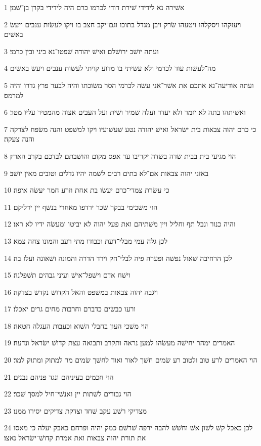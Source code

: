 \par 1 אשׁירה נא לידידי שׁירת דודי לכרמו כרם היה לידידי בקרן בן־שׁמן׃
\par 2 ויעזקהו ויסקלהו ויטעהו שׂרק ויבן מגדל בתוכו וגם־יקב חצב בו ויקו לעשׂות ענבים ויעשׂ באשׁים׃
\par 3 ועתה יושׁב ירושׁלם ואישׁ יהודה שׁפטו־נא ביני ובין כרמי׃
\par 4 מה־לעשׂות עוד לכרמי ולא עשׂיתי בו מדוע קויתי לעשׂות ענבים ויעשׂ באשׁים׃
\par 5 ועתה אודיעה־נא אתכם את אשׁר־אני עשׂה לכרמי הסר משׂוכתו והיה לבער פרץ גדרו והיה למרמס׃
\par 6 ואשׁיתהו בתה לא יזמר ולא יעדר ועלה שׁמיר ושׁית ועל העבים אצוה מהמטיר עליו מטר׃
\par 7 כי כרם יהוה צבאות בית ישׂראל ואישׁ יהודה נטע שׁעשׁועיו ויקו למשׁפט והנה משׂפח לצדקה והנה צעקה׃
\par 8 הוי מגיעי בית בבית שׂדה בשׂדה יקריבו עד אפס מקום והושׁבתם לבדכם בקרב הארץ׃
\par 9 באזני יהוה צבאות אם־לא בתים רבים לשׁמה יהיו גדלים וטובים מאין יושׁב׃
\par 10 כי עשׂרת צמדי־כרם יעשׂו בת אחת וזרע חמר יעשׂה איפה׃
\par 11 הוי משׁכימי בבקר שׁכר ירדפו מאחרי בנשׁף יין ידליקם׃
\par 12 והיה כנור ונבל תף וחליל ויין משׁתיהם ואת פעל יהוה לא יביטו ומעשׂה ידיו לא ראו׃
\par 13 לכן גלה עמי מבלי־דעת וכבודו מתי רעב והמונו צחה צמא׃
\par 14 לכן הרחיבה שׁאול נפשׁה ופערה פיה לבלי־חק וירד הדרה והמונה ושׁאונה ועלז בה׃
\par 15 וישׁח אדם וישׁפל־אישׁ ועיני גבהים תשׁפלנה׃
\par 16 ויגבה יהוה צבאות במשׁפט והאל הקדושׁ נקדשׁ בצדקה׃
\par 17 ורעו כבשׂים כדברם וחרבות מחים גרים יאכלו׃
\par 18 הוי משׁכי העון בחבלי השׁוא וכעבות העגלה חטאה׃
\par 19 האמרים ימהר יחישׁה מעשׂהו למען נראה ותקרב ותבואה עצת קדושׁ ישׂראל ונדעה׃
\par 20 הוי האמרים לרע טוב ולטוב רע שׂמים חשׁך לאור ואור לחשׁך שׂמים מר למתוק ומתוק למר׃
\par 21 הוי חכמים בעיניהם ונגד פניהם נבנים׃
\par 22 הוי גבורים לשׁתות יין ואנשׁי־חיל למסך שׁכר׃
\par 23 מצדיקי רשׁע עקב שׁחד וצדקת צדיקים יסירו ממנו׃
\par 24 לכן כאכל קשׁ לשׁון אשׁ וחשׁשׁ להבה ירפה שׁרשׁם כמק יהיה ופרחם כאבק יעלה כי מאסו את תורת יהוה צבאות ואת אמרת קדושׁ־ישׂראל נאצו׃
